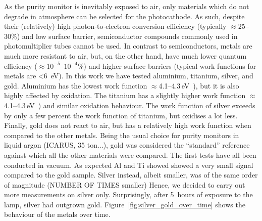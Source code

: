 \documentclass[a4paper,11pt]{article}
\begin{document}
As the purity monitor is inevitably exposed to air, only materials which do not degrade in atmosphere can be selected for the photocathode. As such, despite their (relatively) high photon-to-electron conversion efficiency (typically $\approx$25--30\%) and low surface barrier, semiconductor compounds commonly used in photomultiplier tubes cannot be used. In contrast to semiconductors, metals are much more resistant to air, but, on the other hand, have much lower quantum efficiency ($\approx$$10^{-5}$--$10^{-4}$\%) and higher surface barriers (typical work functions for metals are \SI{<6}{eV}). In this work we have tested aluminium, titanium, silver, and gold. Aluminium has the lowest work function $\approx$4.1--4.3\,eV~\cite{}), but it is also highly affected by oxidation. The titanium has a slightly higher work function $\approx$4.1--4.3\,eV~\cite{}) and similar oxidation behaviour. The work function of silver exceeds by only a few percent the work function of titanium, but oxidises a lot less. Finally, gold does not react to air, but has a relatively high work function when compared to the other metals.
Being the usual choice for purity monitors in liquid argon (ICARUS, 35 ton...), gold was considered the ``standard'' reference against which all the other materials were compared. 
The first tests have all been conducted in vacuum. As expected Al and Ti showed showed a very small signal compared to the gold sample. Silver instead, albeit smaller, was of the same order of magnitude (NUMBER OF TIMES smaller)  
Hence, we decided to carry out more measurements on silver only. Surprisingly, after \SI{5}{hours} of exposure to the lamp, silver had outgrown gold. Figure~\ref{fig:silver_gold_over_time} shows the behaviour of the metals over time. 
\end{document}
